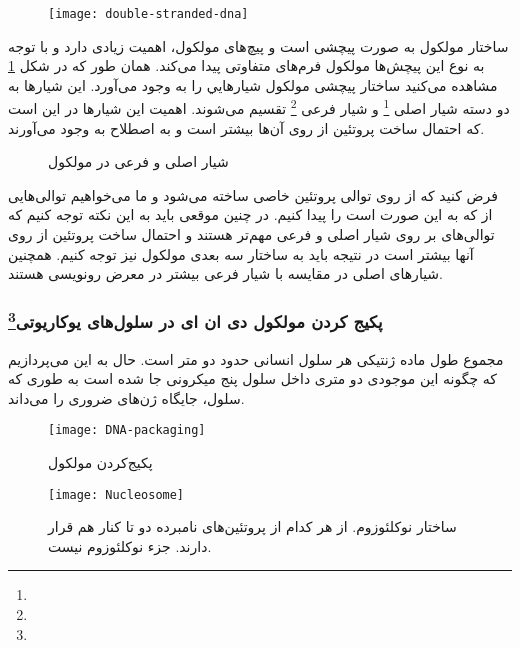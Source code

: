 \begin{figure}[h]
	\centering
	\texttt{[image: double-stranded-dna]}
\end{figure}

ساختار مولکول
به صورت پیچشی است و پیچ‌های مولکول، اهمیت زیادی دارد و با توجه به نوع این پیچش‌ها مولکول فرم‌های متفاوتی پیدا می‌کند.
همان طور که در شکل
\ref{figure:majorAndMinorGroove}
مشاهده می‌کنید ساختار پیچشی مولکول
شیار‌هایي را به وجود می‌آورد. این شیار‌ها به دو دسته شیار اصلی
\footnote{}
و شیار فرعی
\footnote{}
تقسیم می‌شوند. اهمیت این شیارها در این است که احتمال ساخت پروتئین از روی آن‌ها بیشتر است و به اصطلاح
به وجود می‌آورند.

\begin{figure}[h]
	\centering
	\caption{شیار اصلی و فرعی در مولکول
	}
	\label{figure:majorAndMinorGroove}
\end{figure}

فرض کنید که از روی توالی
پروتئین خاصی ساخته می‌شود و ما می‌خواهیم توالی‌هایی از
که به این صورت است را پیدا کنیم. در چنین موقعی باید به این نکته توجه کنیم که توالی‌های بر روی شیار اصلی و فرعی مهم‌تر هستند و احتمال ساخت پروتئین از روی آنها بیشتر است در نتیجه باید به ساختار سه بعدی مولکول
نیز توجه کنیم. همچنین شیار‌های اصلی در مقایسه با شیار فرعی بیشتر در معرض رونویسی هستند.

\pagebreak
\subsubsection{پکیج کردن مولکول دی ان ای در سلول‌های یوکاریوتی\protect\footnote{}}

مجموع طول ماده ژنتیکی هر سلول انسانی حدود دو متر است. حال به این می‌پردازیم که چگونه این موجودی دو متری داخل سلول پنج میکرونی جا شده است به طوری که سلول، جایگاه ژن‌های ضروری را می‌داند.

\begin{figure}[htbp]
	\centering
	\texttt{[image: DNA-packaging]}
	\caption{پکیج‌کردن مولکول 
	}
	\label{figure:dnaPackaging}
\end{figure}

\begin{wrapfigure}[12]{l}{6cm}
	\centering
	\texttt{[image: Nucleosome]}
	\caption{ساختار نوکلئوزوم. از هر کدام از پروتئین‌های نامبرده دو تا کنار هم قرار دارند. 
	جزء نوکلئوزوم نیست.}
	\label{figure:nucleosome}
\end{wrapfigure}



